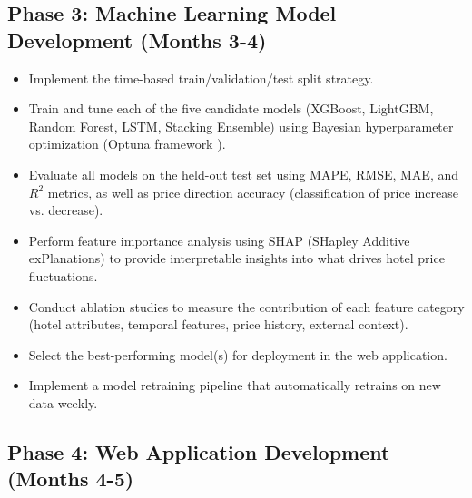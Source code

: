 \documentclass[12pt,a4paper]{report}
\begin{document}
\subsection{Phase 3: Machine Learning Model Development (Months 3-4)}

\begin{itemize}
    \item Implement the time-based train/validation/test split strategy.
    \item Train and tune each of the five candidate models (XGBoost, LightGBM, Random Forest, LSTM, Stacking Ensemble) using Bayesian hyperparameter optimization (Optuna framework \cite{optuna2019}).
    \item Evaluate all models on the held-out test set using MAPE, RMSE, MAE, and $R^2$ metrics, as well as price direction accuracy (classification of price increase vs. decrease).
    \item Perform feature importance analysis using SHAP (SHapley Additive exPlanations) \cite{lundberg2017} to provide interpretable insights into what drives hotel price fluctuations.
    \item Conduct ablation studies to measure the contribution of each feature category (hotel attributes, temporal features, price history, external context).
    \item Select the best-performing model(s) for deployment in the web application.
    \item Implement a model retraining pipeline that automatically retrains on new data weekly.
\end{itemize}

\subsection{Phase 4: Web Application Development (Months 4-5)}
\end{document}
